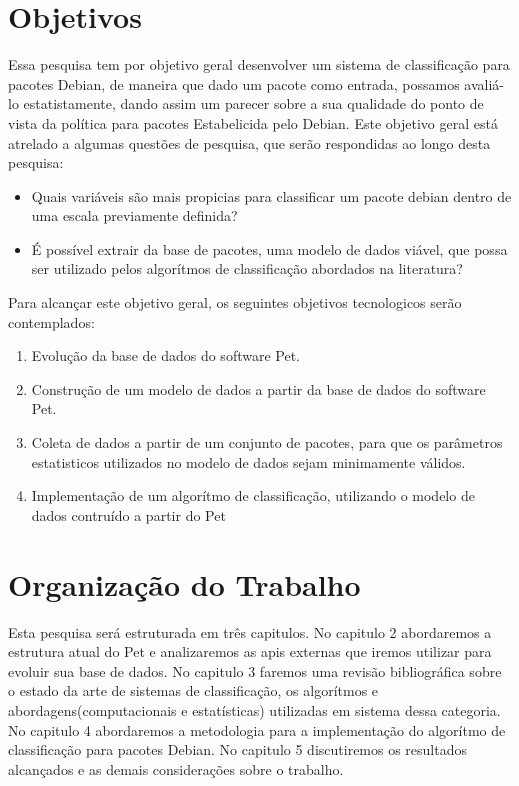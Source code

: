 \section{Objetivos}
        
        Essa pesquisa tem por objetivo geral desenvolver um sistema de classificação para pacotes Debian, de maneira que dado um pacote
        como entrada, possamos avaliá-lo estatistamente, dando assim um parecer sobre a sua qualidade do ponto de vista da política para pacotes Estabelicida pelo Debian.
        Este objetivo geral está atrelado a algumas questões de pesquisa, que serão respondidas ao longo desta pesquisa:
        \begin{itemize}
                \item Quais variáveis são mais propicias para classificar um pacote debian dentro de uma escala previamente definida?
                \item É possível extrair da base de pacotes, uma modelo de dados viável, que possa ser utilizado pelos algorítmos de classificação abordados na literatura?
        \end{itemize}

        Para alcançar este objetivo geral, os seguintes objetivos tecnologicos serão contemplados:
                \begin{enumerate}
                        \item Evolução da base de dados do software Pet.
                        \item Construção de um modelo de dados a partir da base de dados do software Pet.
                        \item Coleta de dados a partir de um conjunto de pacotes, para que os parâmetros estatisticos utilizados no modelo de dados sejam minimamente válidos.
                        \item Implementação de um algorítmo de classificação, utilizando o modelo de dados contruído a partir do Pet
                \end{enumerate}

\section{Organização do Trabalho}
        
        Esta pesquisa será estruturada em três capitulos. No capitulo 2 abordaremos a estrutura atual do Pet e analizaremos as apis externas que iremos utilizar para evoluir sua base de dados. 
        No capitulo 3 faremos uma revisão bibliográfica sobre o estado da arte de sistemas de classificação, os algorítmos e abordagens(computacionais e estatísticas) utilizadas em sistema dessa categoria. No capitulo 4 abordaremos a metodologia para a implementação do algorítmo de classificação para pacotes Debian. No capitulo 5 discutiremos os resultados alcançados e as demais considerações sobre o trabalho.
